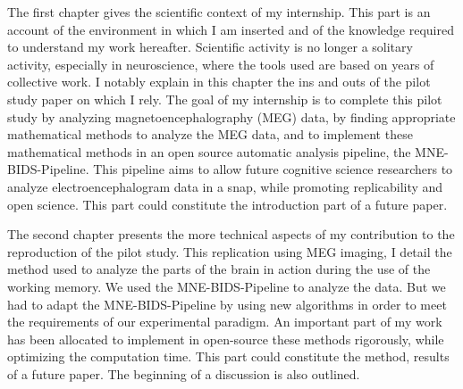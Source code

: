 The first chapter gives the scientific context of my internship. This part is an account of the environment in which I am inserted and of the knowledge required to understand my work hereafter. Scientific activity is no longer a solitary activity, especially in neuroscience, where the tools used are based on years of collective work. I notably explain in this chapter the ins and outs of the pilot study paper \cite{herbst2021abstracting} on which I rely. The goal of my internship is to complete this pilot study by analyzing magnetoencephalography (MEG) data, by finding appropriate mathematical methods to analyze the MEG data, and to implement these mathematical methods in an open source automatic analysis pipeline, the MNE-BIDS-Pipeline. This pipeline aims to allow future cognitive science researchers to analyze electroencephalogram data in a snap, while promoting replicability and open science. This part could constitute the introduction part of a future paper.

The second chapter presents the more technical aspects of my contribution to the reproduction of the pilot study. This replication using MEG imaging, I detail the method used to analyze the parts of the brain in action during the use of the working memory. We used the MNE-BIDS-Pipeline to analyze the data. But we had to adapt the MNE-BIDS-Pipeline by using new algorithms in order to meet the requirements of our experimental paradigm. An important part of my work has been allocated to implement in open-source these methods rigorously, while optimizing the computation time. This part could constitute the method, results of a future paper. The beginning of a discussion is also outlined.

